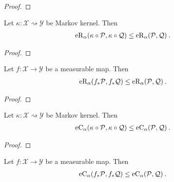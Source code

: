 \begin{proof}\leanok

\end{proof}


\begin{lemma}\label{lem:erenyiDiv_comp_le}
  \leanok
Let $\kappa : \mathcal{X} \rightsquigarrow \mathcal{Y}$ be Markov kernel. Then
\begin{align*}
  \operatorname{eR}_\alpha(\kappa \circ \mathcal{P}, \kappa \circ \mathcal{Q})
  &\le \operatorname{eR}_\alpha(\mathcal{P}, \mathcal{Q})
  \: .
\end{align*}
\end{lemma}

\begin{proof}\leanok

\end{proof}


\begin{lemma}\label{lem:erenyiDiv_map_le}
  \leanok
Let $f : \mathcal{X} \to \mathcal{Y}$ be a measurable map. Then
\begin{align*}
  \operatorname{eR}_\alpha(f_*\mathcal{P}, f_*\mathcal{Q})
  &\le \operatorname{eR}_\alpha(\mathcal{P}, \mathcal{Q})
  \: .
\end{align*}
\end{lemma}

\begin{proof}\leanok

\end{proof}


\begin{lemma}\label{lem:echernoffDiv_comp_le}
  \leanok
Let $\kappa : \mathcal{X} \rightsquigarrow \mathcal{Y}$ be Markov kernel. Then
\begin{align*}
  \operatorname{eC}_\alpha(\kappa \circ \mathcal{P}, \kappa \circ \mathcal{Q})
  &\le \operatorname{eC}_\alpha(\mathcal{P}, \mathcal{Q})
  \: .
\end{align*}
\end{lemma}

\begin{proof}\leanok

\end{proof}


\begin{lemma}\label{lem:echernoffDiv_map_le}
  \leanok
Let $f : \mathcal{X} \to \mathcal{Y}$ be a measurable map. Then
\begin{align*}
  \operatorname{eC}_\alpha(f_*\mathcal{P}, f_*\mathcal{Q})
  &\le \operatorname{eC}_\alpha(\mathcal{P}, \mathcal{Q})
  \: .
\end{align*}
\end{lemma}

